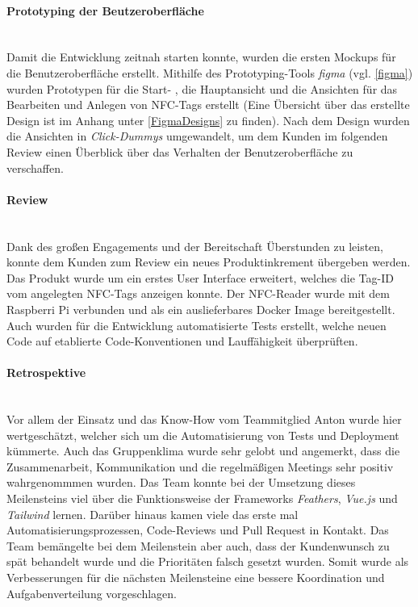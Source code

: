 \documentclass[10pt, a4paper]{article}
\begin{document}
\paragraph*{Prototyping der Beutzeroberfläche} $~$ \\
Damit die Entwicklung zeitnah starten konnte, wurden die ersten Mockups für die Benutzeroberfläche erstellt.
Mithilfe des Prototyping-Tools \textit{figma} (vgl. \ref*{figma}) wurden Prototypen für die Start- , die Hauptansicht und die Ansichten
für das Bearbeiten und Anlegen von NFC-Tags erstellt (Eine Übersicht über das erstellte Design ist im Anhang unter \ref*{FigmaDesigns} zu finden).
Nach dem Design wurden die Ansichten in \textit{Click-Dummys} umgewandelt, um dem Kunden im folgenden Review einen Überblick über das Verhalten der
Benutzeroberfläche zu verschaffen.

\paragraph*{Review} $~$ \\
Dank des großen Engagements und der Bereitschaft Überstunden zu leisten, konnte dem Kunden zum Review ein neues Produktinkrement übergeben werden.
Das Produkt wurde um ein erstes User Interface erweitert, welches die Tag-ID vom angelegten NFC-Tags anzeigen konnte.
Der NFC-Reader wurde mit dem Raspberri Pi verbunden und als ein auslieferbares Docker Image bereitgestellt.
Auch wurden für die Entwicklung automatisierte Tests erstellt, welche neuen Code auf etablierte Code-Konventionen und Lauffähigkeit überprüften.

\paragraph*{Retrospektive} $~$ \\
Vor allem der Einsatz und das Know-How vom Teammitglied Anton wurde hier wertgeschätzt, welcher sich um die Automatisierung von Tests und Deployment kümmerte.
Auch das Gruppenklima wurde sehr gelobt und angemerkt, dass die Zusammenarbeit, Kommunikation und die regelmäßigen Meetings sehr positiv wahrgenommmen wurden.
Das Team konnte bei der Umsetzung dieses Meilensteins viel über die Funktionsweise der Frameworks \textit{Feathers}, \textit{Vue.js} und \textit{Tailwind} lernen.
Darüber hinaus kamen viele das erste mal Automatisierungsprozessen, Code-Reviews und Pull Request in Kontakt.
Das Team bemängelte bei dem Meilenstein aber auch, dass der Kundenwunsch zu spät behandelt wurde und die Prioritäten falsch gesetzt wurden.
Somit wurde als Verbesserungen für die nächsten Meilensteine eine bessere Koordination und Aufgabenverteilung vorgeschlagen.
\end{document}
